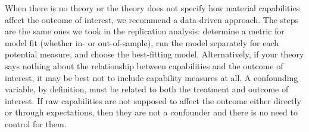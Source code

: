 When there is no theory or the theory does not specify how material capabilities affect the outcome of interest, we recommend a data-driven approach.
The steps are the same ones we took in the replication analysis: determine a metric for model fit (whether in- or out-of-sample), run the model separately for each potential measure, and choose the best-fitting model.
Alternatively, if your theory says nothing about the relationship between capabilities and the outcome of interest, it may be best not to include capability measures at all.
A confounding variable, by definition, must be related to both the treatment and outcome of interest.
If raw capabilities are not supposed to affect the outcome either directly or through expectations, then they are not a confounder and there is no need to control for them.

